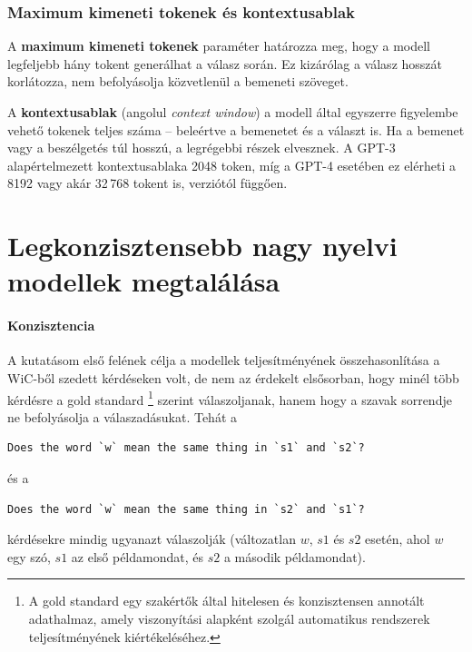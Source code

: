 \documentclass[12pt]{report}
\theoremstyle{definition}
\begin{document}
\subsection{Maximum kimeneti tokenek és kontextusablak}

A \textbf{maximum kimeneti tokenek} paraméter határozza meg, hogy a modell legfeljebb hány tokent generálhat a válasz során. Ez kizárólag a válasz hosszát korlátozza, nem befolyásolja közvetlenül a bemeneti szöveget.


A \textbf{kontextusablak} (angolul \textit{context window}) a modell által egyszerre figyelembe vehető tokenek teljes száma – beleértve a bemenetet és a választ is. Ha a bemenet vagy a beszélgetés túl hosszú, a legrégebbi részek elvesznek. A GPT-3 alapértelmezett kontextusablaka 2048 token, míg a GPT-4 esetében ez elérheti a 8192 vagy akár 32\,768 tokent is, verziótól függően.


\chapter{Legkonzisztensebb nagy nyelvi modellek megtalálása}

\subsubsection{Konzisztencia}
A kutatásom első felének célja a modellek teljesítményének összehasonlítása a WiC-ből szedett kérdéseken volt, de nem az érdekelt elsősorban, hogy minél több kérdésre a gold standard \footnote{A gold standard egy szakértők által hitelesen és konzisztensen annotált adathalmaz, amely viszonyítási alapként szolgál automatikus rendszerek teljesítményének kiértékeléséhez.} szerint válaszoljanak, hanem hogy a szavak sorrendje ne befolyásolja a válaszadásukat. Tehát a
\begin{verbatim}
Does the word `w` mean the same thing in `s1` and `s2`?
\end{verbatim}
és a
\begin{verbatim}
Does the word `w` mean the same thing in `s2` and `s1`?
\end{verbatim}

kérdésekre mindig ugyanazt válaszolják (változatlan $w$, $s1$ és $s2$ esetén, ahol $w$ egy szó, $s1$ az első példamondat, és $s2$ a második példamondat).
\end{document}
